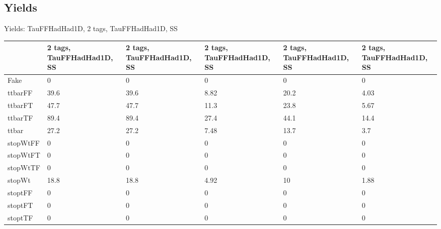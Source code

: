 
\subsection{Yields}

\begin{frame}{Yields: TauFFHadHad1D, 2 tags, TauFFHadHad1D, SS}
\begin{center}
  \begin{tabular}{l| >{\centering\let\newline\\\arraybackslash\hspace{0pt}}m{1.4cm}| >{\centering\let\newline\\\arraybackslash\hspace{0pt}}m{1.4cm}| >{\centering\let\newline\\\arraybackslash\hspace{0pt}}m{1.4cm}| >{\centering\let\newline\\\arraybackslash\hspace{0pt}}m{1.4cm}| >{\centering\let\newline\\\arraybackslash\hspace{0pt}}m{1.4cm}}
    & 2 tags, TauFFHadHad1D, SS & 2 tags, TauFFHadHad1D, SS & 2 tags, TauFFHadHad1D, SS & 2 tags, TauFFHadHad1D, SS & 2 tags, TauFFHadHad1D, SS \\
 \hline \hline
    Fake& 0 & 0 & 0 & 0 & 0 \\
 \hline
    ttbarFF& 39.6 & 39.6 & 8.82 & 20.2 & 4.03 \\
 \hline
    ttbarFT& 47.7 & 47.7 & 11.3 & 23.8 & 5.67 \\
 \hline
    ttbarTF& 89.4 & 89.4 & 27.4 & 44.1 & 14.4 \\
 \hline
    ttbar& 27.2 & 27.2 & 7.48 & 13.7 & 3.7 \\
 \hline
    stopWtFF& 0 & 0 & 0 & 0 & 0 \\
 \hline
    stopWtFT& 0 & 0 & 0 & 0 & 0 \\
 \hline
    stopWtTF& 0 & 0 & 0 & 0 & 0 \\
 \hline
    stopWt& 18.8 & 18.8 & 4.92 & 10 & 1.88 \\
 \hline
    stoptFF& 0 & 0 & 0 & 0 & 0 \\
 \hline
    stoptFT& 0 & 0 & 0 & 0 & 0 \\
 \hline
    stoptTF& 0 & 0 & 0 & 0 & 0 \\

\end{tabular}
\end{center}
\end{frame}
